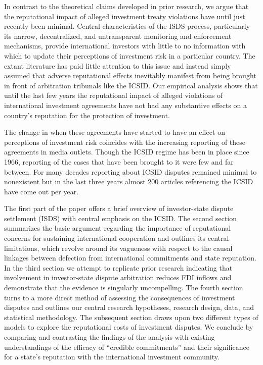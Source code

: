 \documentclass[12pt,onesided]{amsart}
\begin{document}
In contrast to the theoretical claims developed in prior research, we argue that the reputational impact of alleged investment treaty violations have until just recently been minimal. Central characteristics of the ISDS process, particularly its narrow, decentralized, and untransparent monitoring and enforcement mechanisms, provide international investors with little to no information with which to update their perceptions of investment risk in a particular country. The extant literature has paid little attention to this issue and instead simply assumed that adverse reputational effects inevitably manifest from being brought in front of arbitration tribunals like the ICSID. Our empirical analysis shows that until the last few years the reputational impact of alleged violations of international investment agreements have not had any substantive effects on a country's reputation for the protection of investment. 

The change in when these agreements have started to have an effect on perceptions of investment risk coincides with the increasing reporting of these agreements in media outlets. Though the ICSID regime has been in place since 1966, reporting of the cases that have been brought to it were few and far between. For many decades reporting about ICSID disputes remained minimal to nonexistent but in the last three years almost 200 articles referencing the ICSID have come out per year. 

The first part of the paper offers a brief overview of investor-state dispute settlement (ISDS) with central emphasis on the ICSID. The second section summarizes the basic argument regarding the importance of reputational concerns for sustaining international cooperation and outlines its central limitations, which revolve around its vagueness with respect to the causal linkages between defection from international commitments and state reputation. In the third section we attempt to replicate prior research indicating that involvement in investor-state dispute arbitration reduces FDI inflows and demonstrate that the evidence is singularly uncompelling. The fourth section turns to a more direct method of assessing the consequences of investment disputes and outlines our central research hypotheses, research design, data, and statistical methodology. The subsequent section draws upon two different types of models to explore the reputational costs of investment disputes. We conclude by comparing and contrasting the findings of the analysis with existing understandings of the efficacy of ``credible commitments'' and their significance for a state's reputation with the international investment community.
\end{document}
